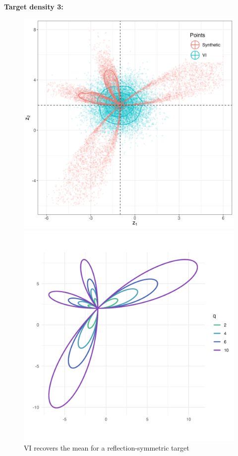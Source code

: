 \documentclass{article}
\begin{document}
\clearpage
\textbf{Target density 3:}
\begin{figure}[h!]
    \centering
    \begin{minipage}{0.6\textwidth}
        \centering
        \includegraphics[width=\linewidth]{plots/VI_ex3.png}
        \caption{VI recovers the mean for a reflection-symmetric target}
    \end{minipage}
    \hfill
    \begin{minipage}{0.45\textwidth}
        \centering
        \includegraphics[width=\linewidth]{plots/level_curves_ex3.png}

\end{minipage}
\end{figure}
\end{document}
